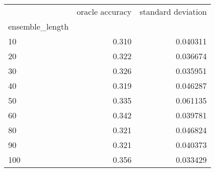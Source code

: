 \begin{tabular}{lrr}
\toprule
{} &  oracle accuracy &  standard deviation \\
ensemble\_length &                  &                     \\
\midrule
10              &            0.310 &            0.040311 \\
20              &            0.322 &            0.036674 \\
30              &            0.326 &            0.035951 \\
40              &            0.319 &            0.046287 \\
50              &            0.335 &            0.061135 \\
60              &            0.342 &            0.039781 \\
80              &            0.321 &            0.046824 \\
90              &            0.321 &            0.040373 \\
100             &            0.356 &            0.033429 \\
\bottomrule
\end{tabular}
